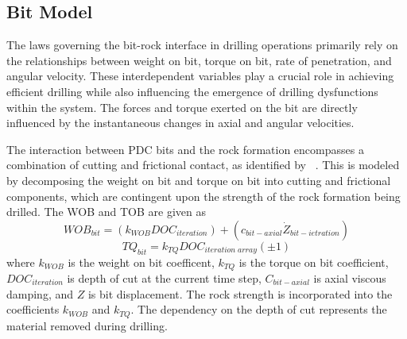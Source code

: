 \subsection{Bit Model}
\label{sec:exxonbitmodel}
The laws governing the bit-rock interface in drilling operations primarily rely on the relationships between weight on bit, torque on bit, rate of penetration, and angular velocity. These interdependent variables play a crucial role in achieving efficient drilling while also influencing the emergence of drilling dysfunctions within the system. The forces and torque exerted on the bit are directly influenced by the instantaneous changes in axial and angular velocities.

The interaction between PDC bits and the rock formation encompasses a combination of cutting and frictional contact, as identified by ~\cite{ref:detournay1992a}.   This is modeled by decomposing the weight on bit and torque on bit into cutting and frictional components, which are contingent upon the strength of the rock formation being drilled.  The WOB and TOB are given as
\begin{equation}\label{WOB}
  WOB_{bit} = (k_{WOB} DOC_{iteration}) + (c_{bit-axial} \dot{Z}_{bit-ietration})
\end{equation}
\begin{equation}\label{Torque}
  TQ_{bit} = k_{TQ} DOC_{iteration\; array} (\pm1)
\end{equation}
where $k_{WOB}$ is the weight on bit coefficent, $k_{TQ}$ is the torque on bit coefficient, $DOC_{iteration}$ is depth of cut at the current time step, $C_{bit-axial}$ is axial viscous damping, and $Z$ is bit displacement.  The rock strength is incorporated into the coefficients $k_{WOB}$ and $k_{TQ}$.  The dependency on the depth of cut represents the material removed during drilling.

